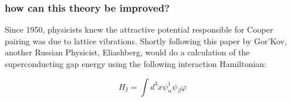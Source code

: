 \documentclass{beamer}
\begin{document}
\begin{frame}
\frametitle{how can this theory be improved?}
Since 1950, physicists knew the attractive potential responsible for Cooper pairing was due to lattice vibrations. Shortly following this paper by Gor'Kov, another Russian Physicist, Eliashberg, would do a calculation of the superconducting gap energy using the following interaction Hamiltonian:

\begin{equation*}
H_I = \int d^3 x \psi^{\dagger}_{\alpha} \psi_{\beta} \varphi
\end{equation*}
\end{frame}
\end{document}
